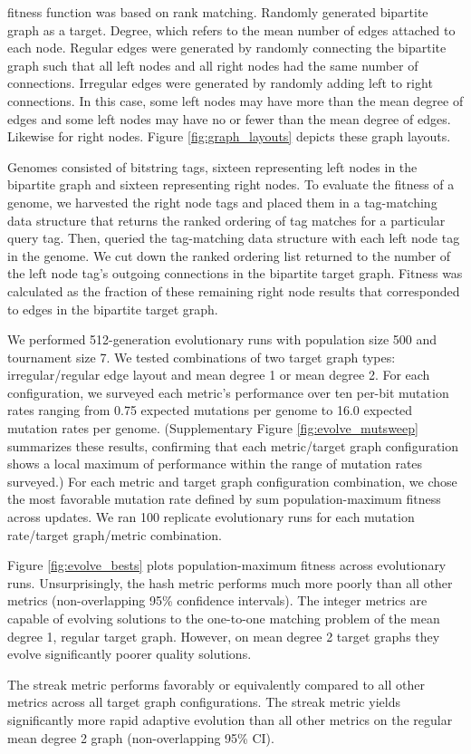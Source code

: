 fitness function was based on rank matching.
Randomly generated bipartite graph as a target.
Degree, which refers to the mean number of edges attached to each node.
Regular edges were generated by randomly connecting the bipartite graph such that all left nodes and all right nodes had the same number of connections.
Irregular edges were generated by randomly adding left to right connections.
In this case, some left nodes may have more than the mean degree of edges and some left nodes may have no or fewer than the mean degree of edges.
Likewise for right nodes.
Figure \ref{fig:graph_layouts} depicts these graph layouts.

Genomes consisted of bitstring tags, sixteen representing left nodes in the bipartite graph and sixteen representing right nodes.
To evaluate the fitness of a genome, we harvested the right node tags and placed them in a tag-matching data structure that returns the ranked ordering of tag matches for a particular query tag.
Then, queried the tag-matching data structure with each left node tag in the genome.
We cut down the ranked ordering list returned to the number of the left node tag's outgoing connections in the bipartite target graph.
Fitness was calculated as the fraction of these remaining right node results that corresponded to edges in the bipartite target graph.

We performed 512-generation evolutionary runs with population size 500 and tournament size 7.
We tested combinations of two target graph types: irregular/regular edge layout and mean degree 1 or mean degree 2.
For each configuration, we surveyed each metric's performance over ten per-bit mutation rates ranging from 0.75 expected mutations per genome to 16.0 expected mutation rates per genome.
(Supplementary Figure \ref{fig:evolve_mutsweep} summarizes these results, confirming that each metric/target graph configuration shows a local maximum of performance within the range of mutation rates surveyed.)
For each metric and target graph configuration combination, we chose the most favorable mutation rate defined by sum population-maximum fitness across updates.
We ran 100 replicate evolutionary runs for each mutation rate/target graph/metric combination.



Figure \ref{fig:evolve_bests} plots population-maximum fitness across evolutionary runs.
Unsurprisingly, the hash metric performs much more poorly than all other metrics (non-overlapping 95\% confidence intervals).
The integer metrics are capable of evolving solutions to the one-to-one matching problem of the mean degree 1, regular target graph.
However, on mean degree 2 target graphs they evolve significantly poorer quality solutions.

The streak metric performs favorably or equivalently compared to all other metrics across all target graph configurations.
The streak metric yields significantly more rapid adaptive evolution than all other metrics on the regular mean degree 2 graph (non-overlapping 95\% CI).
